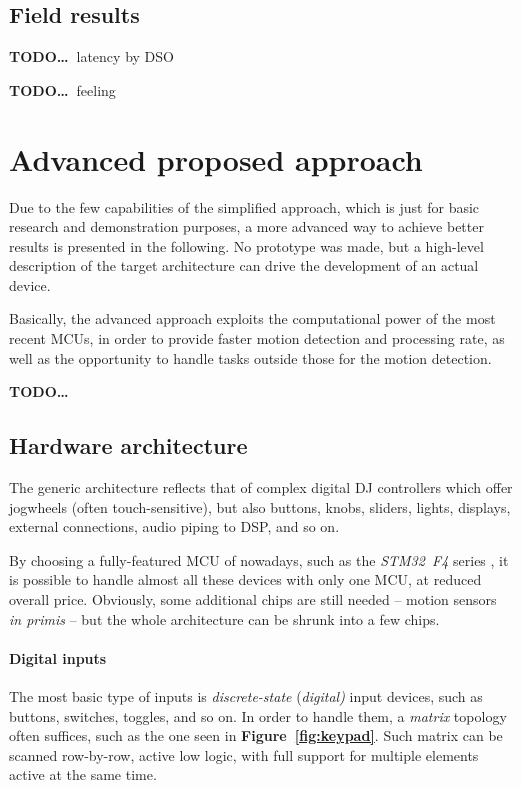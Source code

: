 \documentclass[a4paper,10pt]{article}
\newcommand{\TODO}{\textbf{TODO\dots\ }}
\newcommand{\citef}[1]{\textbf{Figure~\ref{#1}}}
\begin{document}
\begin{multicols}{2}
\subsection{Field results}

\TODO latency by DSO

\TODO feeling


\section{Advanced proposed approach}
\label{sec:advanced_approach}

Due to the few capabilities of the simplified approach, which is just for
basic research and demonstration purposes, a more advanced way to achieve
better results is presented in the following. No prototype was made, but a
high-level description of the target architecture can drive the development
of an actual device.

Basically, the advanced approach exploits the computational power of the most
recent MCUs, in order to provide faster motion detection and processing rate,
as well as the opportunity to handle tasks outside those for the motion
detection.

\TODO


\subsection{Hardware architecture}

The generic architecture reflects that of complex digital DJ controllers
which offer jogwheels (often touch-sensitive), but also buttons, knobs,
sliders, lights, displays, external connections, audio piping to DSP, and so
on.

By choosing a fully-featured MCU of nowadays, such as the \emph{STM32~F4}
series \cite{st_stm32f4}, it is possible to handle almost all these devices
with only one MCU, at reduced overall price. Obviously, some additional chips
are still needed -- motion sensors \emph{in primis} -- but the whole
architecture can be shrunk into a few chips.


\paragraph{Digital inputs}
The most basic type of inputs is \emph{discrete-state} (\emph{digital)} input
devices, such as buttons, switches, toggles, and so on. In order to handle
them, a \emph{matrix} topology often suffices, such as the one seen in
\citef{fig:keypad}. Such matrix can be scanned row-by-row, active low logic,
with full support for multiple elements active at the same time.


\end{multicols}
\end{document}
